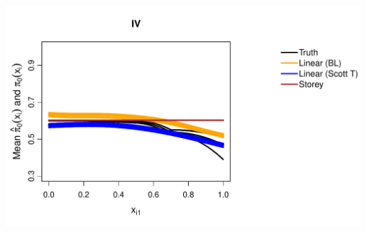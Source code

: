 \documentclass{article}\usepackage[]{graphicx}\usepackage[]{color}
\makeatletter
\def\maxwidth{ %
  \ifdim\Gin@nat@width>\linewidth
    \linewidth
  \else
    \Gin@nat@width
  \fi
}
\newenvironment{knitrout}{}{} %
\makeatother
\begin{document}
\begin{knitrout}
{\includegraphics[width=\maxwidth]{Figures/plot_of_mean_estimates_t_10000-7} 

}



\end{knitrout}
\end{document}
